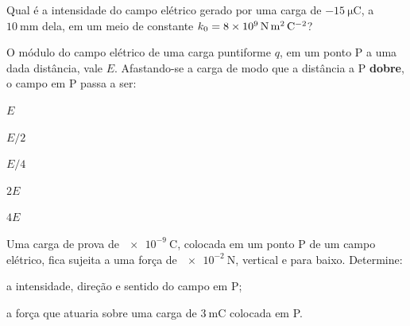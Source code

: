 \legendaniveis

\blocofixacao

\begin{questao}[1]{}
Qual é a intensidade do campo elétrico gerado por uma carga de
$\SI{-15}{\micro\coulomb}$, a $\SI{10}{\milli\meter}$ dela, em um meio de constante
$k_{0} = \SI{8e9}{\newton\meter\squared\per\coulomb\squared}$?
\end{questao}

\begin{questao}[1]{}
O módulo do campo elétrico de uma carga puntiforme $q$, em um ponto P a uma dada
distância, vale $E$. Afastando-se a carga de modo que a distância a P
\textbf{dobre}, o campo em P passa a ser:
\begin{alternativas}[3]
\item $E$
\item $E/2$
\item $E/4$
\item $2E$
\item $4E$
\end{alternativas}
\end{questao}

\blocoaplicacao

\begin{questao}[2]{}
Uma carga de prova de $\SI{e-9}{\coulomb}$, colocada em um ponto P de um campo
elétrico, fica sujeita a uma força de $\SI{e-2}{\newton}$, vertical e para baixo.
Determine:
\begin{itensq}
\item a intensidade, direção e sentido do campo em P;
\item a força que atuaria sobre uma carga de $\SI{3}{\milli\coulomb}$ colocada em P.
\end{itensq}
\end{questao}

